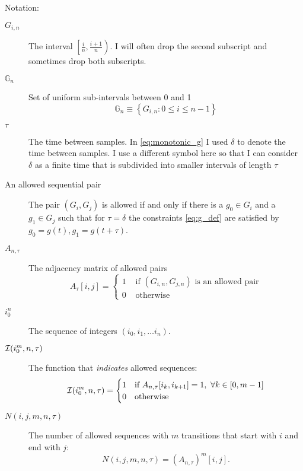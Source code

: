 \documentclass[12pt]{article} \usepackage{amsmath,amsfonts}
\newcommand{\field}[1]{\mathbb{#1}}
\newcommand\G{\field{G}}
\newcommand\I{{\cal I}}
\begin{document}
Notation:
\begin{description}
\item[$G_{i,n}$] The interval $\left[ \frac{i}{n}, \frac{i+1}{n}
  \right)$.  I will often drop the second subscript and sometimes drop
  both subscripts.
\item[$\G_n$] Set of uniform sub-intervals between 0 and 1
  \begin{equation*}
    \G_n \equiv \left\{ G_{i,n} : 0 \leq i \leq n-1 \right\}
  \end{equation*}
\item[$\tau$] The time between samples.  In \eqref{eq:monotonic_g} I
  used $\delta$ to denote the time between samples.  I use a different
  symbol here so that I can consider $\delta$ as a finite time that is
  subdivided into smaller intervals of length $\tau$
\item[An allowed sequential pair] The pair $(G_i, G_j)$ is allowed if
  and only if there is a $g_0\in G_i$ and a $g_1 \in G_j$ such that
  for $\tau=\delta$ the constraints \eqref{eq:g_def} are satisfied by
  $g_0=g(t), g_1=g(t+\tau)$.
\item[$A_{n,\tau}$] The adjacency matrix of allowed pairs
  \begin{equation*}
    A_\tau[i,j] =
    \begin{cases}
      1 &\text{ if } (G_{i,n}, G_{j,n}) \text{ is an allowed pair}\\
      0 &\text{ otherwise}
    \end{cases}
  \end{equation*}
\item[$i_0^n$] The sequence of integers $\left( i_0, i_1, \ldots i_n
  \right)$.
\item[$\I(i_0^m,n,\tau)$] The function that \emph{indicates} allowed
  sequences:
  \begin{equation*}
    \I(i_0^m,n,\tau) =
    \begin{cases}
      1 & \text{if }A_{n,\tau}[i_k,i_{k+1}] = 1,~ \forall k \in [0,m-1]\\
      0 & \text{otherwise}
    \end{cases}
  \end{equation*}
\item[$N(i,j,m,n,\tau)$] The number of allowed sequences with $m$
  transitions that start with $i$ and end with $j$:
  \begin{equation*}
    N(i,j,m,n,\tau) = \left( A_{n,\tau} \right)^m[i,j].
  \end{equation*}
\end{description}
\end{document}
